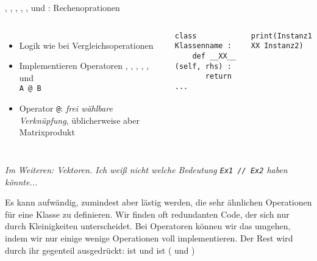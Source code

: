 
\begin{frame}[fragile]{, , , , ,  und : Rechenoprationen}
%
\begin{columns}[T]
\begin{itemize}
\item Logik wie bei Vergleichsoperationen
\item Implementieren Operatoren , , , , ,  und\\
 \texttt{A @ B}
\item Operator \texttt{@}: \emph{frei wählbare Verknüpfung}, üblicherweise aber Matrixprodukt
\end{itemize}
%
\begin{codebox}
\begin{verbatim}
class Klassenname :
    def __XX__ (self, rhs) :
       return ...
\end{verbatim}
\end{codebox}
%
\begin{codebox}
\begin{verbatim}
print(Instanz1 XX Instanz2)
\end{verbatim}
\end{codebox}
\end{columns}
%
\vspace{6pt}
\emph{Im Weiteren: Vektoren. Ich weiß nicht welche Bedeutung \texttt{Ex1 // Ex2} haben könnte...}
%
\end{frame}


\begin{frame}
%
\begin{hintbox}
Es kann aufwändig, zumindest aber lästig werden, die sehr ähnlichen Operationen für eine Klasse zu definieren. Wir finden oft redundanten Code, der sich nur durch Kleinigkeiten unterscheidet. Bei Operatoren können wir das umgehen, indem wir nur einige wenige Operationen voll implementieren. Der Rest wird durch ihr gegenteil ausgedrückt:  ist  und  ist  ( und )
\end{hintbox}
%
\end{frame}

